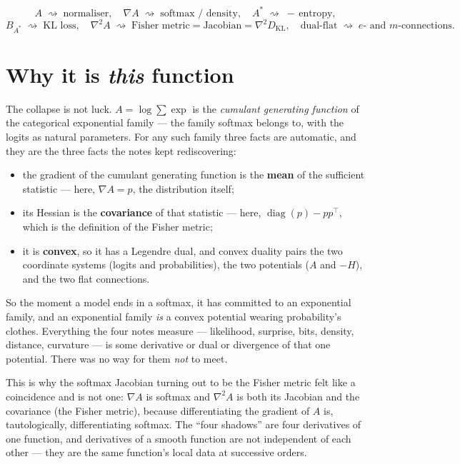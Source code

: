 \documentclass[11pt]{article}
\begin{document}
\begin{summary}
\[
  A \;\rightsquigarrow\; \text{normaliser},\quad
  \nabla A \;\rightsquigarrow\; \text{softmax / density},\quad
  A^{*} \;\rightsquigarrow\; -\,\text{entropy},
\]
\[
  B_{A^{*}} \;\rightsquigarrow\; \text{KL loss},\quad
  \nabla^2 A \;\rightsquigarrow\; \text{Fisher metric} = \text{Jacobian} = \nabla^2 D_{\mathrm{KL}},\quad
  \text{dual-flat} \;\rightsquigarrow\; e\text{- and }m\text{-connections}.
\]
\end{summary}

\section{Why it is \emph{this} function}

The collapse is not luck. $A = \log\sum\exp$ is the \emph{cumulant generating function} of the
categorical exponential family --- the family softmax belongs to, with the logits as natural
parameters. For any such family three facts are automatic, and they are the three facts the
notes kept rediscovering:
\begin{itemize}[leftmargin=1.5em]
  \item the gradient of the cumulant generating function is the \textbf{mean} of the
  sufficient statistic --- here, $\nabla A = p$, the distribution itself;
  \item its Hessian is the \textbf{covariance} of that statistic --- here, $\operatorname{diag}(p)
  - pp^{\top}$, which is the definition of the Fisher metric;
  \item it is \textbf{convex}, so it has a Legendre dual, and convex duality pairs the two
  coordinate systems (logits and probabilities), the two potentials ($A$ and $-H$), and the two
  flat connections.
\end{itemize}
So the moment a model ends in a softmax, it has committed to an exponential family, and an
exponential family \emph{is} a convex potential wearing probability's clothes. Everything the
four notes measure --- likelihood, surprise, bits, density, distance, curvature --- is some
derivative or dual or divergence of that one potential. There was no way for them \emph{not} to
meet.

\begin{insight}
This is why the softmax Jacobian turning out to be the Fisher metric felt like a coincidence
and is not one: $\nabla A$ is softmax and $\nabla^2 A$ is both its Jacobian and the covariance
(the Fisher metric), because differentiating the gradient of $A$ is, tautologically,
differentiating softmax. The ``four shadows'' are four derivatives of one function, and
derivatives of a smooth function are not independent of each other --- they are the same
function's local data at successive orders.
\end{insight}
\end{document}
